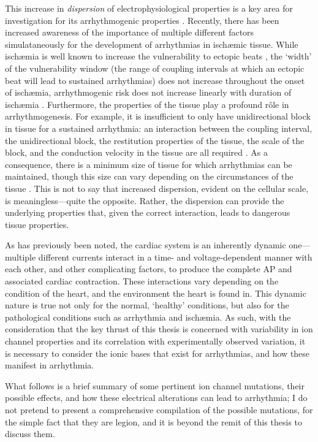 \documentclass[../thesis-main.tex]{subfiles}
\begin{document}
 This increase in \emph{dispersion} of electrophysiological properties is a key area for investigation for its arrhythmogenic properties \citep{Kuo1983}. Recently, there has been increased awareness of the importance of multiple different factors simulataneously for the development of arrhythmias in isch\ae{}mic tissue. While isch\ae{}mia is well known to increase the vulnerability to ectopic beats \citep{Zhang2011}, the `width' of the vulnerability window (the range of coupling intervals at which an ectopic beat will lead to sustained arrhythmias) does not increase throughout the onset of isch\ae{}mia, \idest{} arrhythmogenic risk does not increase linearly with duration of isch\ae{}mia \citep{Tice2007, Romero2009a, Barrett1997}. Furthermore, the properties of the tissue play a profound r\^ole in arrhythmogenesis. For example, it is insufficient to only have unidirectional block in tissue for a sustained arrhythmia: an interaction between the coupling interval, the unidirectional block, the restitution properties of the tissue, the scale of the block, and the conduction velocity in the tissue are all required \citep{Coronel2009, Cherry2012}. As a consequence, there is a minimum size of tissue for which arrhythmias can be maintained, though this size can vary depending on the circumstances of the tissue \citep{Adeniran2011}. This is not to say that increased dispersion, evident on the cellular scale, is meaningless---quite the opposite. Rather, the dispersion can provide the underlying properties that, given the correct interaction, leads to dangerous tissue properties.
 
 As has previously been noted, the cardiac system is an inherently dynamic one---multiple different currents interact in a time- and voltage-dependent manner with each other, and other complicating factors, to produce the complete AP and associated cardiac contraction. These interactions vary depending on the condition of the heart, and the environment the heart is found in. This dynamic nature is true not only for the normal, `healthy' conditions, but also for the pathological conditions such as arrhythmia and isch\ae{}mia. As such, with the consideration that the key thrust of this thesis is concerned with variability in ion channel properties and its correlation with experimentally observed variation, it is necessary to consider the ionic bases that exist for arrhythmias, and how these manifest in arrhythmia.
 
 What follows is a brief summary of some pertinent ion channel mutations, their possible effects, and how these electrical alterations can lead to arrhythmia; I do not pretend to present a comprehensive compilation of the possible mutations, for the simple fact that they are legion, and it is beyond the remit of this thesis to discuss them.
 
\end{document}
